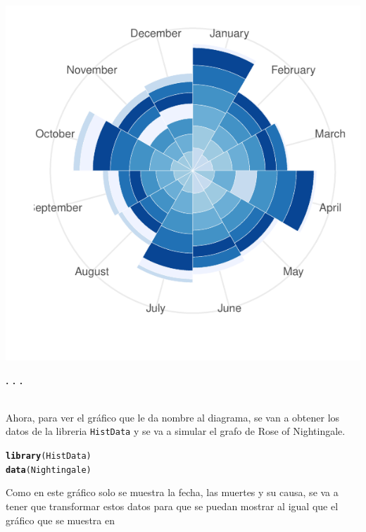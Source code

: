 \documentclass{article}\usepackage[]{graphicx}\usepackage[]{color}
\makeatletter
\def\maxwidth{ %
  \ifdim\Gin@nat@width>\linewidth
    \linewidth
  \else
    \Gin@nat@width
  \fi
}
\newcommand{\hlstd}[1]{\textcolor[rgb]{0.345,0.345,0.345}{#1}}%
\newcommand{\hlkwd}[1]{\textcolor[rgb]{0.737,0.353,0.396}{\textbf{#1}}}%
\newenvironment{kframe}{%
 \def\at@end@of@kframe{}%
 \ifinner\ifhmode%
  \def\at@end@of@kframe{\end{minipage}}%
  \begin{minipage}{\columnwidth}%
 \fi\fi%
 \def\FrameCommand##1{\hskip\@totalleftmargin \hskip-\fboxsep
 \colorbox{shadecolor}{##1}\hskip-\fboxsep
     \hskip-\linewidth \hskip-\@totalleftmargin \hskip\columnwidth}%
 \MakeFramed {\advance\hsize-\width
   \@totalleftmargin\z@ \linewidth\hsize
   \@setminipage}}%
 {\par\unskip\endMakeFramed%
 \at@end@of@kframe}
\newenvironment{knitrout}{}{} %
\makeatother
\begin{document}
\begin{knitrout}
\color{fgcolor}

{\centering \includegraphics[width=\maxwidth]{figure/plot_rose_1-1} 

}



\end{knitrout}
\begin{center}
\textbf{. . .}
\end{center}
~\\
Ahora, para ver el gr\'afico que le da nombre al diagrama, se van a obtener los datos de la libreria \texttt{HistData} y se va a simular el grafo de Rose of Nightingale.
\begin{knitrout}
\color{fgcolor}\begin{kframe}
\begin{alltt}
\hlkwd{library}\hlstd{(HistData)}
\hlkwd{data}\hlstd{(Nightingale)}
\end{alltt}
\end{kframe}
\end{knitrout}
Como en este gr\'afico solo se muestra la fecha, las muertes y su causa, se va a tener que transformar estos datos para que se puedan mostrar al igual que el gr\'afico que se muestra en \cite[p\'ag 113]{Circle}
\end{document}
